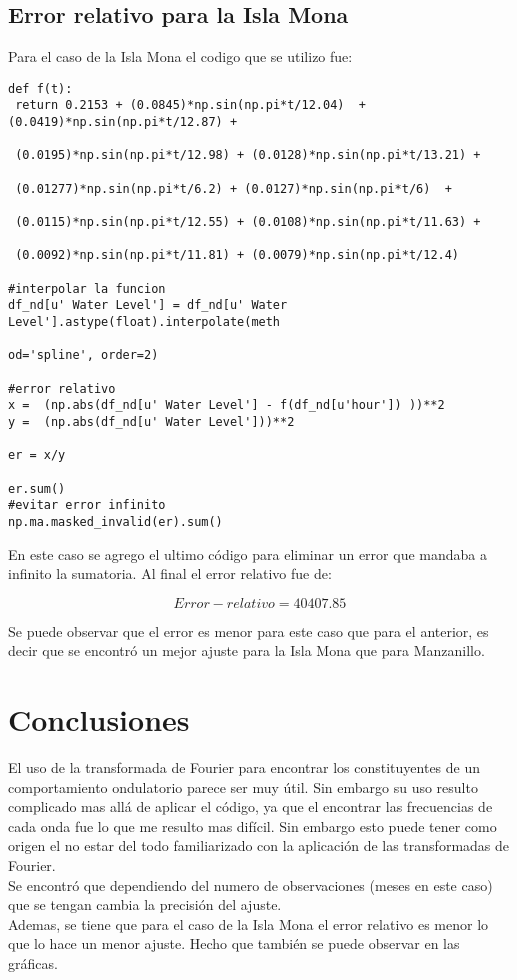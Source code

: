 \documentclass[12pt,letterpaper]{article}
\begin{document}
\subsection{Error relativo para la Isla Mona}

Para el caso de la Isla Mona el codigo que se utilizo fue:

\begin{verbatim}
def f(t):
 return 0.2153 + (0.0845)*np.sin(np.pi*t/12.04)  + (0.0419)*np.sin(np.pi*t/12.87) +
 
 (0.0195)*np.sin(np.pi*t/12.98) + (0.0128)*np.sin(np.pi*t/13.21) +
 
 (0.01277)*np.sin(np.pi*t/6.2) + (0.0127)*np.sin(np.pi*t/6)  +
 
 (0.0115)*np.sin(np.pi*t/12.55) + (0.0108)*np.sin(np.pi*t/11.63) +
 
 (0.0092)*np.sin(np.pi*t/11.81) + (0.0079)*np.sin(np.pi*t/12.4)    

#interpolar la funcion
df_nd[u' Water Level'] = df_nd[u' Water Level'].astype(float).interpolate(meth

od='spline', order=2)

#error relativo
x =  (np.abs(df_nd[u' Water Level'] - f(df_nd[u'hour']) ))**2
y =  (np.abs(df_nd[u' Water Level']))**2

er = x/y

er.sum()
#evitar error infinito
np.ma.masked_invalid(er).sum()
\end{verbatim}

En este caso se agrego el ultimo código para eliminar un error que mandaba a infinito la sumatoria. Al final el error relativo fue de:

$$ Error-relativo = 40407.85$$

Se puede observar que el error es menor para este caso que para el anterior, es decir que se encontró un mejor ajuste para la Isla Mona que para Manzanillo.
\section{Conclusiones} 

El uso de la transformada de Fourier para encontrar los constituyentes de un comportamiento ondulatorio parece ser muy útil. Sin embargo su uso resulto complicado mas allá de aplicar el código, ya que el encontrar las frecuencias de cada onda fue lo que me resulto mas difícil. Sin embargo esto puede tener como origen el no estar del todo familiarizado con la aplicación de las transformadas de Fourier.\\
Se encontró que dependiendo del numero de observaciones (meses en este caso) que se tengan cambia la precisión del ajuste.\\
Ademas, se tiene que para el caso de la Isla Mona el error relativo es menor lo que lo hace un menor ajuste. Hecho que también se puede observar en las gráficas.
\end{document}
